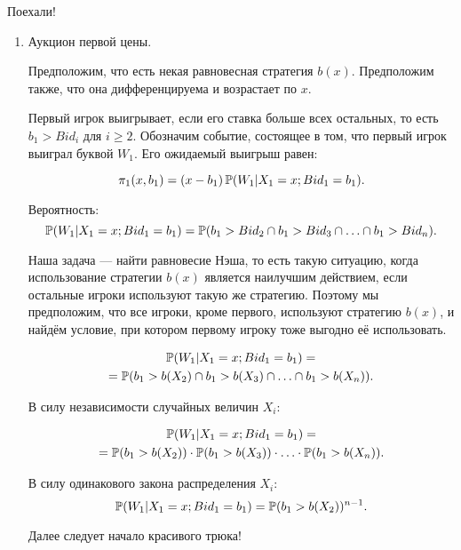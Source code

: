 Поехали!
\begin{enumerate}
\item Аукцион первой цены.

Предположим, что есть некая равновесная стратегия $ b(x) $. Предположим также, что она дифференцируема и возрастает по $x$.

Первый игрок выигрывает, если его ставка больше всех остальных, то есть $ b_{1}>Bid_{i} $ для $ i\geq 2 $. Обозначим событие, состоящее в том, что первый игрок выиграл буквой $ W_{1} $. Его ожидаемый выигрыш равен:


\begin{equation}
\label{first_price_eq}
\pi_{1}(x,b_{1})=(x-b_{1})\P(W_{1}|X_{1}=x; Bid_{1}=b_{1}).
\end{equation}

Вероятность:
\begin{equation}
\P(W_{1}|X_{1}=x; Bid_{1}=b_{1})=\P(b_{1}>Bid_{2} \cap b_{1}>Bid_{3} \cap \ldots \cap b_{1}>Bid_{n}).
\end{equation}


Наша задача — найти равновесие Нэша, то есть такую ситуацию, когда использование стратегии $ b(x) $ является наилучшим действием, если остальные игроки используют такую же стратегию. Поэтому мы предположим, что все игроки, кроме первого,  используют стратегию $ b(x) $, и найдём условие, при котором первому игроку тоже выгодно её использовать.

\begin{multline}
\P(W_{1}|X_{1}=x; Bid_{1}=b_{1})=\\
=\P(b_{1}>b(X_{2}) \cap b_{1}>b(X_{3}) \cap \ldots \cap b_{1}>b(X_{n})).
\end{multline}

В силу независимости случайных величин $ X_{i} $:

\begin{multline}
\P(W_{1}|X_{1}=x; Bid_{1}=b_{1})=\\
=\P(b_{1}>b(X_{2}))\cdot \P(b_{1}>b(X_{3}))\cdot \ldots\cdot \P(b_{1}>b(X_{n})).
\end{multline}

В силу одинакового закона распределения $ X_{i} $:
\begin{equation}
\P(W_{1}|X_{1}=x; Bid_{1}=b_{1})=\P(b_{1}>b(X_{2}))^{n-1}.
\end{equation}



Далее следует начало красивого трюка!


\end{enumerate}
